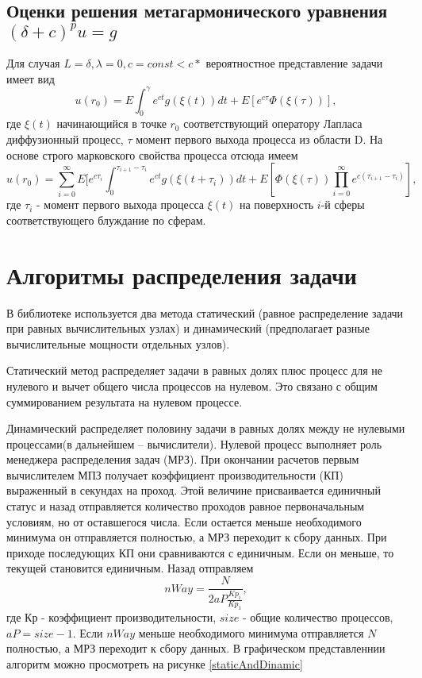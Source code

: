 \subsection{Оценки решения метагармонического уравнения$(\delta+c)^{p}u=g $}
Для случая $L=\delta, \lambda=0,c = const<c*$ вероятностное представление задачи имеет вид 
\begin{equation} u(r_{0})=E\int_{0}^{\gamma}e^{ct}g(\xi(t))dt+E[e^{c\tau}\Phi(\xi(\tau))],\end{equation}
где $\xi(t)$  начинающийся в точке $r_{0}$ соответствующий оператору Лапласа диффузионный процесс, $\tau $  момент первого выхода процесса из области D. На основе строго марковского свойства процесса отсюда имеем 
\begin{equation} u(r_{0})=\sum_{i=0}^{\infty} E [e^{c\tau_{i}} \int_{0}^{\tau_{i+1}-\tau_{i}}e^{ct}g(\xi(t+\tau_{i}))dt+E[\Phi(\xi(\tau)){}
\prod_{i=0}^{\infty}e^{c(\tau_{i+1}-\tau_{i})}],\end{equation}
где $ \tau_{i}$ - момент первого выхода процесса $\xi(t)$ на поверхность $i$-й сферы соответствующего блуждание по сферам.
\section{Алгоритмы распределения задачи}
В библиотеке используется два метода статический (равное распределение задачи при равных вычислительных узлах) и динамический (предполагает разные вычислительные мощности отдельных узлов).

Статический метод распределяет задачи в равных долях плюс процесс для не нулевого и вычет общего числа процессов на нулевом. Это связано с общим суммированием результата на нулевом процессе.

Динамический распределяет половину задачи в равных долях между не нулевыми процессами(в дальнейшем -- вычислители). Нулевой процесс выполняет роль менеджера распределения задач (МРЗ). При окончании расчетов первым вычислителем МПЗ получает коэффициент производительности (КП) выраженный в секундах на проход. Этой величине присваивается единичный статус и назад отправляется количество проходов равное первоначальным условиям, но от оставшегося числа. Если остается меньше необходимого минимума он отправляется полностью, а МРЗ переходит к сбору данных. При приходе последующих КП они сравниваются с единичным. Если он меньше, то текущей становится единичным. Назад отправляем \begin{equation} nWay = \frac{N}{2aP\frac{Kp_{i}}{Kp_{1}}}, \end{equation} где Кр - коэффициент производительности, $size$ - общие количество процессов, $aP=size-1$. Если $nWay$ меньше необходимого минимума отправляется $N$ полностью, а МРЗ переходит к сбору данных. В графическом представленнии алгоритм можно просмотреть на рисунке \ref{staticAndDinamic}


